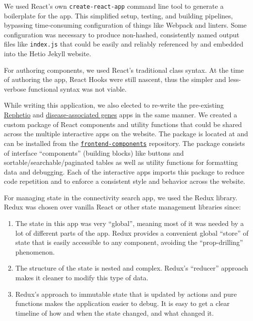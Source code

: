 We used React's own \texttt{create-react-app} command line tool to generate a boilerplate for the app.
This simplified setup, testing, and building pipelines, bypassing time-consuming configuration of things like Webpack and linters.
Some configuration was necessary to produce non-hashed, consistently named output files like \texttt{index.js} that could be easily and reliably referenced by and embedded into the Hetio Jekyll website.

For authoring components, we used React's traditional class syntax.
At the time of authoring the app, React Hooks were still nascent, thus the simpler and less-verbose functional syntax was not viable.

While writing this application, we also elected to re-write the pre-existing \href{https://het.io/repurpose/}{Rephetio} and \href{https://het.io/disease-genes/}{disease-associated genes} apps in the same manner.
We created a custom package of React components and utility functions that could be shared across the multiple interactive apps on the website.
The package is located at and can be installed from the \href{https://github.com/hetio/frontend-components}{\texttt{frontend-components}} repository.
The package consists of interface ``components'' (building blocks) like buttons and sortable/searchable/paginated tables as well as utility functions for formatting data and debugging.
Each of the interactive apps imports this package to reduce code repetition and to enforce a consistent style and behavior across the website.

For managing state in the connectivity search app, we used the Redux library.
Redux was chosen over vanilla React or other state management libraries since:

\begin{enumerate}
\def\labelenumi{\arabic{enumi}.}
\tightlist
\item
  The state in this app was very ``global'', meaning most of it was needed by a lot of different parts of the app.
  Redux provides a convenient global ``store'' of state that is easily accessible to any component, avoiding the ``prop-drilling'' phenomenon.
\item
  The structure of the state is nested and complex.
  Redux's ``reducer'' approach makes it cleaner to modify this type of data.
\item
  Redux's approach to immutable state that is updated by actions and pure functions makes the application easier to debug.
  It is easy to get a clear timeline of how and when the state changed, and what changed it.
\end{enumerate}

